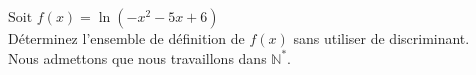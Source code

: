 \documentclass[a4paper,fleqn]{article}
\date{\today}
\begin{document}
	$\text{Soit } f(x) = \ln (-x^2-5x+6)$ \\
	Déterminez l'ensemble de définition de $f(x)$ sans utiliser de discriminant.\\
	Nous admettons que nous travaillons dans $\mathbb{N}^*$.
\end{document}
